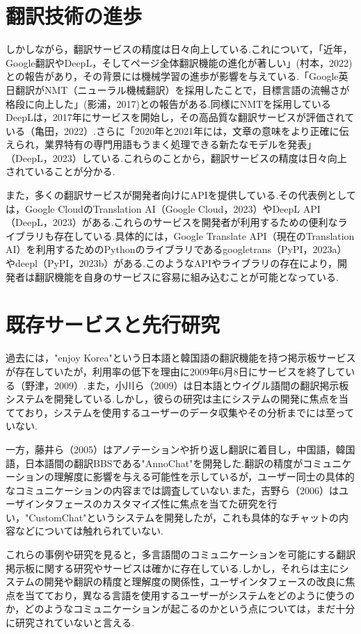 \documentclass[b5paper,12pt,dvipdfmx]{jsreport}
\begin{document}
\section{翻訳技術の進歩}

しかしながら，翻訳サービスの精度は日々向上している.これについて，「近年，Google翻訳やDeepL，そしてページ全体翻訳機能の進化が著しい」(村本，2022)との報告があり，その背景には機械学習の進歩が影響を与えている.「Google英日翻訳がNMT（ニューラル機械翻訳）を採用したことで，目標言語の流暢さが格段に向上した」(影浦，2017)との報告がある.同様にNMTを採用しているDeepLは，2017年にサービスを開始し，その高品質な翻訳サービスが評価されている（亀田，2022）.さらに「2020年と2021年には，文章の意味をより正確に伝えられ，業界特有の専門用語もうまく処理できる新たなモデルを発表」（DeepL，2023）している.これらのことから，翻訳サービスの精度は日々向上されていることが分かる.

また，多くの翻訳サービスが開発者向けにAPIを提供している.その代表例としては，Google CloudのTranslation AI（Google Cloud，2023）やDeepL API（DeepL，2023）がある.これらのサービスを開発者が利用するための便利なライブラリも存在している.具体的には，Google Translate API（現在のTranslation AI）を利用するためのPythonのライブラリであるgoogletrans（PyPI，2023a）やdeepl（PyPI，2023b）がある.このようなAPIやライブラリの存在により，開発者は翻訳機能を自身のサービスに容易に組み込むことが可能となっている.

\section{既存サービスと先行研究}

過去には，"enjoy Korea"という日本語と韓国語の翻訳機能を持つ掲示板サービスが存在していたが，利用率の低下を理由に2009年6月8日にサービスを終了している（野津，2009）.また，小川ら（2009）は日本語とウイグル語間の翻訳掲示板システムを開発している.しかし，彼らの研究は主にシステムの開発に焦点を当てており，システムを使用するユーザーのデータ収集やその分析までには至っていない.

一方，藤井ら（2005）はアノテーションや折り返し翻訳に着目し，中国語，韓国語，日本語間の翻訳BBSである"AnnoChat"を開発した.翻訳の精度がコミュニケーションの理解度に影響を与える可能性を示しているが，ユーザー同士の具体的なコミュニケーションの内容までは調査していない.また，吉野ら（2006）はユーザインタフェースのカスタマイズ性に焦点を当てた研究を行い，"CustomChat"というシステムを開発したが，これも具体的なチャットの内容などについては触れられていない.

これらの事例や研究を見ると，多言語間のコミュニケーションを可能にする翻訳掲示板に関する研究やサービスは確かに存在している.しかし，それらは主にシステムの開発や翻訳の精度と理解度の関係性，ユーザインタフェースの改良に焦点を当てており，異なる言語を使用するユーザーがシステムをどのように使うのか，どのようなコミュニケーションが起こるのかという点については，まだ十分に研究されていないと言える.
\end{document}
